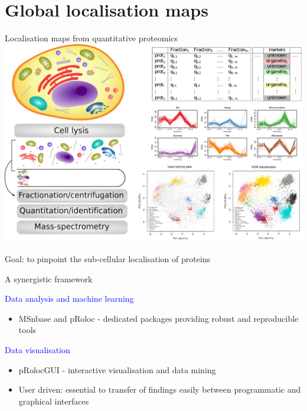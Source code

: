 \documentclass[bigger]{beamer}
\begin{document}

\section{Global localisation maps}

\begin{frame}{Localisation maps from quantitative proteomics}
\bigskip
      \includegraphics[width=1\linewidth]{Figures/lopit-new.pdf} 
       \begin{center} 
       \footnotesize{Goal: to pinpoint the sub-cellular localisation of proteins}
       \end{center}

\end{frame}

  
        


\begin{frame}{A synergistic framework}
  \begin{block} \large \textcolor{Blue}{Data analysis and machine learning}
  \begin{itemize}
  \item MSnbase and pRoloc - dedicated packages providing robust 
  and reproducible tools
   \end{itemize}    
  \end{block}

  \begin{block} \large \textcolor{Blue}{Data visualisation} 
    \begin{itemize}
    \item pRolocGUI - interactive visualisation and data mining
    \item User driven: essential to transfer of findings easily between 
    programmatic and graphical interfaces
    \end{itemize}
  \end{block}
\end{frame}
\end{document}

